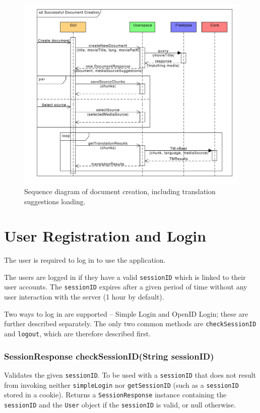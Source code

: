 {\begin{figure}[h]
\begin{center}
\includegraphics[scale=0.65]{figures/document_creation_sequence_RPC.pdf}
\end{center}
\caption{Sequence diagram of document creation, including translation suggestions loading.}\label{rpc:sd:document_creation}
\end{figure}

\section{User Registration and Login}
\label{sec:rpc:login}

The user is required to log in to use the application.

The users are logged in if they have a valid {\tt sessionID} which is linked to their user accounts.
The {\tt sessionID} expires after a given period of time without any user interaction with the server (1 hour by default).

Two ways to log in are supported -- Simple Login and OpenID Login; these are further described separately. The only two common methods are {\tt checkSessionID} and {\tt logout}, which are therefore described first.

\subsubsection{SessionResponse checkSessionID(String sessionID)}
Validates the given {\tt sessionID}. To be used with a {\tt sessionID} that does not result from invoking neither {\tt simpleLogin} nor {\tt getSessionID} (such as a {\tt sessionID} stored in a cookie).
Returns a {\tt SessionResponse} instance containing the {\tt sessionID} and the {\tt User} object if the {\tt sessionID} is valid, or null otherwise.

}

